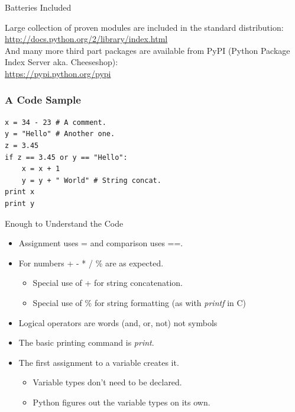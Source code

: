 \documentclass[12pt,handout]{beamer}
\begin{document}
\begin{frame}{Batteries Included}

Large collection of proven modules are included in the
standard distribution:
\\[.5cm]
\url{http://docs.python.org/2/library/index.html}
\\[.5cm]
And many more third part packages are available from PyPI
(Python Package Index Server aka. Cheeseshop):
\\[.5cm]
\url{https://pypi.python.org/pypi}

\end{frame}

\begin{frame}[fragile]
\frametitle{A Code Sample}

\small{
\begin{verbatim}
x = 34 - 23 # A comment.
y = "Hello" # Another one.
z = 3.45
if z == 3.45 or y == "Hello":
    x = x + 1
    y = y + " World" # String concat.
print x
print y
\end{verbatim}
}

\end{frame}

\begin{frame}{Enough to Understand the Code}

\begin{itemize}

\item Assignment uses = and comparison uses ==.
\item For numbers + - * / \% are as expected.
\begin{itemize}
\item Special use of + for string concatenation.
\item Special use of \% for string formatting (as with {\it printf} in C)
\end{itemize}
\item Logical operators are words (and, or, not)
not symbols
\item The basic printing command is {\it print}.
\item The first assignment to a variable creates it.
\begin{itemize}
\item Variable types don't need to be declared.
\item Python figures out the variable types on its own.
\end{itemize}

\end{itemize}

\end{frame}
\end{document}
